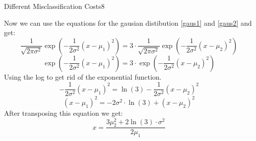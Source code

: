 \begin{questions}
\begin{question}{Different Misclassification Costs}{8}
\begin{answer}
Now we can use the equations for the gausian distibution \ref{gaus1} and \ref{gaus2} and get:
\begin{equation}
	\frac{1}{\sqrt{2\pi\sigma^2}} \exp(-\frac{1}{2\sigma^2}(x-\mu_1)^2) = 3\cdot \frac{1}{\sqrt{2\pi\sigma^2}} \exp(-\frac{1}{2\sigma^2}(x-\mu_2)^2)
\end{equation}
\begin{equation}
 \exp(-\frac{1}{2\sigma^2}(x-\mu_1)^2) = 3\cdot  \exp(-\frac{1}{2\sigma^2}(x-\mu_2)^2)
\end{equation}
Using the log to get rid of the exponential function.
\begin{equation}
	 -\frac{1}{2\sigma^2}(x-\mu_1)^2 = \ln(3)  -\frac{1}{2\sigma^2}(x-\mu_2)^2
\end{equation}
\begin{equation}
	(x-\mu_1)^2 = -2\sigma^2 \cdot \ln(3) + (x-\mu_2)^2
\end{equation}
After transposing this equation we get:
\begin{equation}
	x = \frac{3\mu_2^2 + 2\ln(3)\cdot\sigma^2}{2\mu_1}
\end{equation}

\end{answer}

\end{question}


\end{questions}
